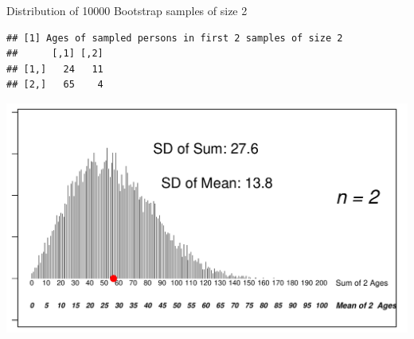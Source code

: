 \documentclass[10pt]{beamer}\usepackage[]{graphicx}\usepackage[]{color}
\makeatletter
\def\maxwidth{ %
  \ifdim\Gin@nat@width>\linewidth
    \linewidth
  \else
    \Gin@nat@width
  \fi
}
\newenvironment{kframe}{%
 \def\at@end@of@kframe{}%
 \ifinner\ifhmode%
  \def\at@end@of@kframe{\end{minipage}}%
  \begin{minipage}{\columnwidth}%
 \fi\fi%
 \def\FrameCommand##1{\hskip\@totalleftmargin \hskip-\fboxsep
 \colorbox{shadecolor}{##1}\hskip-\fboxsep
     \hskip-\linewidth \hskip-\@totalleftmargin \hskip\columnwidth}%
 \MakeFramed {\advance\hsize-\width
   \@totalleftmargin\z@ \linewidth\hsize
   \@setminipage}}%
 {\par\unskip\endMakeFramed%
 \at@end@of@kframe}
\newenvironment{knitrout}{}{} %
\makeatother
\begin{document}
\begin{frame}[fragile]{Distribution of 10000 Bootstrap samples of size 2}
\begin{knitrout}\tiny
{}\color{fgcolor}\begin{kframe}
\begin{verbatim}
## [1] Ages of sampled persons in first 2 samples of size 2
##      [,1] [,2]
## [1,]   24   11
## [2,]   65    4
\end{verbatim}
\end{kframe}

{\centering \includegraphics[width=\maxwidth]{figure/unnamed-chunk-2-1} 

}


\end{knitrout}
	
\end{frame}
\end{document}
